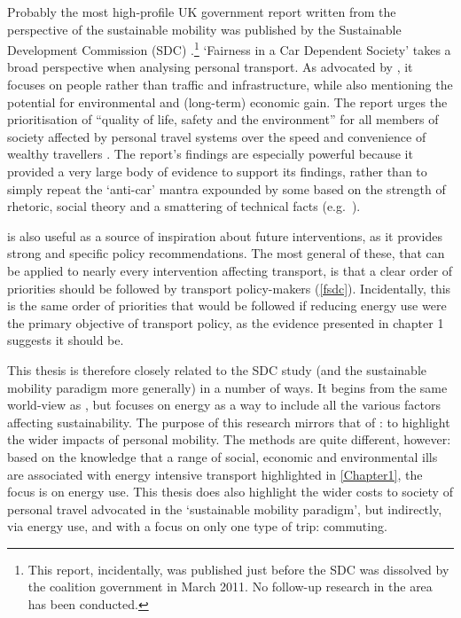 \documentclass[a4paper, 11pt, twoside]{Thesis}
\begin{document}
Probably the most high-profile UK government report written from the perspective
of the sustainable mobility was published by the Sustainable Development
Commission (SDC) \citep{Kay2011}.\footnote{This report, incidentally, was
published just before the SDC was dissolved
by the coalition government in March 2011. No follow-up research
in the area has been conducted.
}
`Fairness in a Car
Dependent Society' takes
a broad perspective when analysing personal transport.
As advocated by \citet{Banister2008},
it focuses on people rather than traffic and infrastructure, while also mentioning
the potential for environmental and (long-term) economic gain.
The report urges the prioritisation of
``quality of life, safety and the environment'' for all members of society
affected by personal travel systems over the speed and convenience of
wealthy travellers \citep[p.~5]{Kay2011}. The report's findings are
especially powerful because it provided a very large body of evidence
to support its findings, rather than to simply repeat the `anti-car' mantra
expounded by some based on the strength of rhetoric, social theory and
a smattering of technical facts (e.g.~\citealp{Dennis2009}).

\citet{Kay2011} is also useful as a source of inspiration about
future interventions, as it provides 
strong and specific policy recommendations. The most general of these, that 
can be applied to nearly every intervention affecting transport, is that a clear order
of priorities should be followed by transport policy-makers (\cref{fsdc}).
Incidentally, this is the same order of priorities that would be
followed if reducing energy use were the primary objective of
transport policy, as the evidence presented in chapter 1 suggests it should be.

This thesis is therefore closely related to the SDC study (and
the sustainable mobility paradigm more generally) in a number of ways.
It begins from the same world-view as \citet{Banister2008}, but
focuses on energy as a way to include all the various
factors affecting sustainability. The purpose of this research mirrors
that of \citet{Kay2011}:  to highlight the wider impacts of
personal mobility.
The methods are quite different, however: based 
on the knowledge that a range of social, economic and environmental ills are
associated with energy intensive transport highlighted in \cref{Chapter1}, the focus
is on
energy use. This thesis does also
highlight the wider costs to society of personal travel advocated
in the `sustainable mobility paradigm', but indirectly,
via energy use, and with a focus on only one type of trip: commuting.
\end{document}
